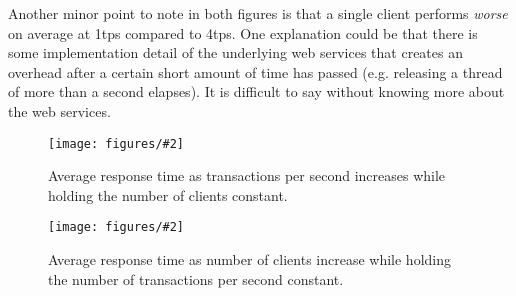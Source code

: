 \documentclass{article}
\newcommand{\addfigure}[4]{

\begin{figure}[h]
	\centering
	\texttt{[image: figures/\#2]}
	\caption{#3}
	\label{#4}
\end{figure}

}
\begin{document}
Another minor point to note in both figures is that a single client performs \textit{worse} on average at 1tps compared to 4tps. One explanation could be that there is some implementation detail of the underlying web services that creates an overhead after a certain short amount of time has passed (e.g. releasing a thread of more than a second elapses). It is difficult to say without knowing more about the web services.
\addfigure{0.5}{performance.pdf}{Average response time as transactions per second increases while holding the number of clients constant.}{f:results}
	
\addfigure{0.5}{clients.pdf}{Average response time as number of clients increase while holding the number of transactions per second constant.}{f:clients}
\end{document}
